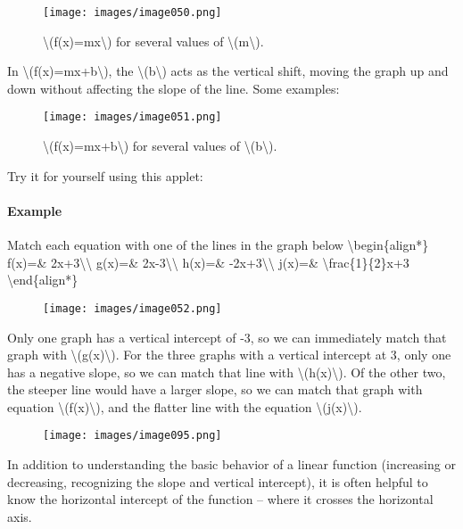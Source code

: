 \begin{figure}
\centering
\texttt{[image: images/image050.png]}
\caption{\textbackslash{}(f(x)=mx\textbackslash{}) for several values of
\textbackslash{}(m\textbackslash{}).}
\end{figure}

In \textbackslash{}(f(x)=mx+b\textbackslash{}), the
\textbackslash{}(b\textbackslash{}) acts as the vertical shift, moving
the graph up and down without affecting the slope of the line. Some
examples:

\begin{figure}
\centering
\texttt{[image: images/image051.png]}
\caption{\textbackslash{}(f(x)=mx+b\textbackslash{}) for several values
of \textbackslash{}(b\textbackslash{}).}
\end{figure}

Try it for yourself using this applet:

\hypertarget{applet_container}{}

\hypertarget{example}{%
\paragraph{Example}\label{example}}

Match each equation with one of the lines in the graph below
\textbackslash{}begin\{align*\} f(x)=\&
2x+3\textbackslash{}\textbackslash{} g(x)=\&
2x-3\textbackslash{}\textbackslash{} h(x)=\&
-2x+3\textbackslash{}\textbackslash{} j(x)=\&
\textbackslash{}frac\{1\}\{2\}x+3 \textbackslash{}end\{align*\}

\begin{figure}
\centering
\texttt{[image: images/image052.png]}
\caption{}
\end{figure}

Only one graph has a vertical intercept of -3, so we can immediately
match that graph with \textbackslash{}(g(x)\textbackslash{}). For the
three graphs with a vertical intercept at 3, only one has a negative
slope, so we can match that line with
\textbackslash{}(h(x)\textbackslash{}). Of the other two, the steeper
line would have a larger slope, so we can match that graph with equation
\textbackslash{}(f(x)\textbackslash{}), and the flatter line with the
equation \textbackslash{}(j(x)\textbackslash{}).

\begin{figure}
\centering
\texttt{[image: images/image095.png]}
\caption{}
\end{figure}

In addition to understanding the basic behavior of a linear function
(increasing or decreasing, recognizing the slope and vertical
intercept), it is often helpful to know the horizontal intercept of the
function -- where it crosses the horizontal axis.

